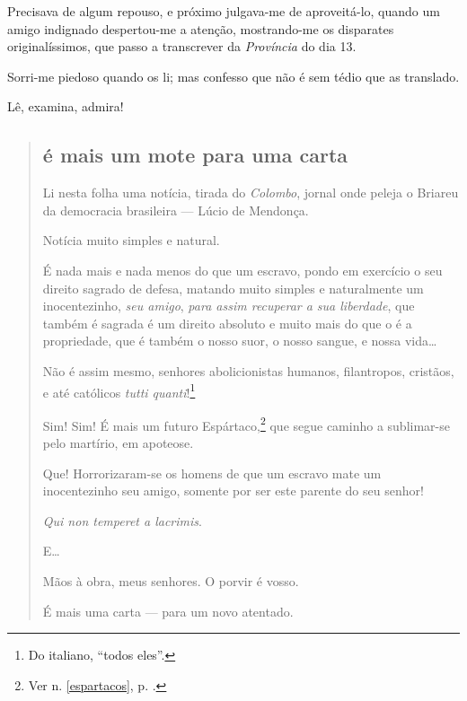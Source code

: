Precisava de algum repouso, e próximo julgava-me de aproveitá-lo, quando
um amigo indignado despertou-me a atenção, mostrando-me os disparates
originalíssimos, que passo a transcrever da \emph{Província} do dia 13.

Sorri-me piedoso quando os li; mas confesso que não é sem tédio que as
translado.

Lê, examina, admira!

\begin{quote}
\subsection{é mais um mote para uma carta}

Li nesta folha uma notícia, tirada do \emph{Colombo}, jornal onde peleja 
o Briareu da democracia brasileira --- Lúcio de Mendonça.

Notícia muito simples e natural.

É nada mais e nada menos do que um escravo, pondo em exercício o seu
direito sagrado de defesa, matando muito simples e naturalmente um
inocentezinho, \emph{seu amigo}, \emph{para assim recuperar a sua
liberdade}, que também é sagrada é um direito absoluto e muito mais do
que o é a propriedade, que é também o nosso suor, o nosso sangue, e
nossa vida\ldots{}

Não é assim mesmo, senhores abolicionistas humanos, filantropos,
cristãos, e até católicos \emph{tutti quanti}!\footnote{Do italiano,
  ``todos eles''.}

\noindent\dotfill{}

Sim! Sim! É mais um futuro Espártaco,\footnote{Ver n. \ref{espartacos}, p. \pageref{espartacos}.} que segue caminho a sublimar-se pelo martírio, em
apoteose.

Que! Horrorizaram-se os homens de que um escravo mate um inocentezinho
seu amigo, somente por ser este parente do seu senhor!

\emph{Qui non temperet a lacrimis}.

E\ldots{}

Mãos à obra, meus senhores. O porvir é vosso.

É mais uma carta --- para um novo atentado.


\end{quote}
